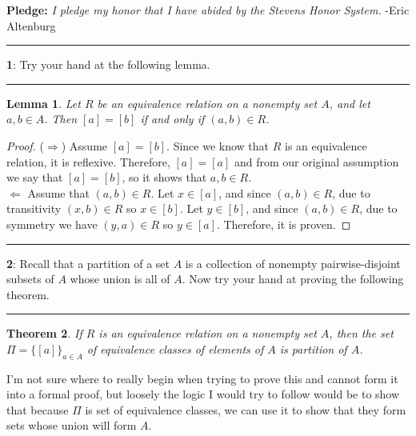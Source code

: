 \documentclass[11pt]{article}
\newtheorem{theorem}{Theorem}
\newcommand\question[2]{\vspace{.25in}\hrule\textbf{#1}: #2\vspace{.5em}\hrule\vspace{.10in}}
\newtheorem{lemma}[theorem]{Lemma}
\begin{document}
\raggedright
\newcommand\NAME{Eric Altenburg}  %
\newcommand\COURSE{MA-240}
\newcommand\HWNUM{8/9}              %


\textbf{Pledge:} \textit{I pledge my honor that I have abided by the Stevens Honor System.} -Eric Altenburg

\question{1}{Try your hand at the following lemma.}

\begin{lemma}
	Let $R$ be an equivalence relation on a nonempty set $A$, and let $a,b \in A$. Then $\left[a\right]=\left[b\right]$ if and only if $(a,b)\in R$.
\end{lemma}

\begin{proof}
	($\Rightarrow$) Assume $[a]=[b]$. Since we know that $R$ is an equivalence relation, it is reflexive. Therefore, $[a] = [a]$ and from our original assumption we say that $[a]=[b]$, so it shows that $a,b \in R$.\\
	{$\Leftarrow$} Assume that $(a,b) \in R$. Let $x \in [a]$, and since $(a,b) \in R$, due to transitivity $(x,b) \in R$ so $x \in [b]$. Let $y \in [b]$, and since $(a,b) \in R$, due to symmetry we have $(y,a) \in R$ so $y \in [a]$. Therefore, it is proven.
\end{proof}



\question{2}{Recall that a partition of a set $A$ is a collection of nonempty pairwise-disjoint subsets of $A$ whose union is all of $A$. Now try your hand at proving the following theorem.}

\begin{theorem}
	If $R$ is an equivalence relation on a nonempty set $A$, then the set $\Pi=\{[a]\}_{a\in A}$ of equivalence classes of elements of $A$ is partition of $A$.
\end{theorem}	

I'm not sure where to really begin when trying to prove this and cannot form it into a formal proof, but loosely the logic I would try to follow would be to show that because $\Pi$ is set of equivalence classes, we can use it to show that they form sets whose union will form $A$.
\end{document}
